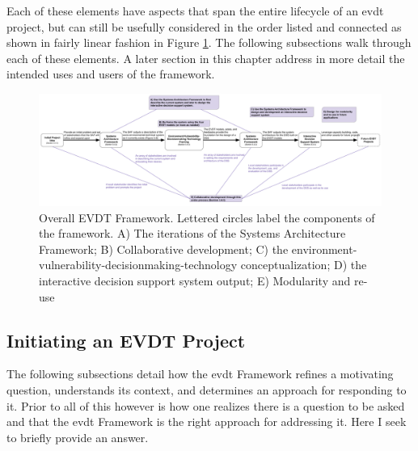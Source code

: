 Each of these elements have aspects that span the entire lifecycle of an \ac{evdt} project, but can still be usefully considered in the order listed and connected as shown in fairly linear fashion in Figure \ref{fig:evdt_framework}. The following subsections walk through each of these elements. A later section in this chapter address in more detail the intended uses and users of the framework.

\begin{landscape}
\begin{figure}[t]
	\centering
	\includegraphics[width=1.3\textwidth]{Figures/chap3/evdt_framework.png}
	\caption[Overall EVDT Framework]{Overall EVDT Framework. Lettered circles label the components of the framework. A) The iterations of the Systems Architecture Framework; B) Collaborative development; C) the environment-vulnerability-decisionmaking-technology conceptualization; D) the interactive decision support system output; E) Modularity and re-use}
	\label{fig:evdt_framework}
\end{figure}
\end{landscape}



\subsection{Initiating an EVDT Project} \label{sec:initiate}

The following subsections detail how the \ac{evdt} Framework refines a motivating question, understands its context, and determines an approach for responding to it. Prior to all of this however is how one realizes there is a question to be asked and that the \ac{evdt} Framework is the right approach for addressing it. Here I seek to briefly provide an answer.

